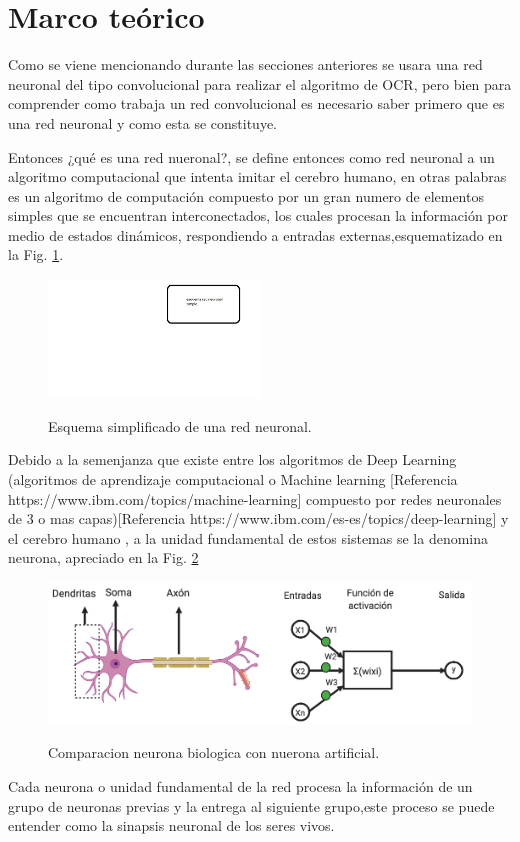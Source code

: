 \section{Marco teórico}
Como se viene mencionando durante las secciones anteriores se usara una red neuronal del tipo convolucional para realizar el algoritmo de OCR,
pero bien para comprender como trabaja un red convolucional es necesario saber primero que es una red neuronal y como esta se constituye.

Entonces ¿qué es una red nueronal?, se define entonces como red neuronal a un algoritmo computacional que intenta imitar el cerebro 
humano, en otras palabras es un algoritmo de computación compuesto por un gran numero de elementos simples que se 
encuentran interconectados, los cuales procesan la información por medio de estados dinámicos, respondiendo a entradas externas,esquematizado en 
 la Fig. \ref*{fig:esquema-redes}.
\begin{figure}[h]
    \centering
    \includegraphics[width=0.5\textwidth]{imgs/Redes-esquema.jpg}
    \label{fig:esquema-redes}
    \caption{Esquema simplificado de una red neuronal.}
\end{figure}
Debido a la semenjanza que existe entre los algoritmos de Deep Learning (algoritmos de aprendizaje computacional o 
Machine learning [Referencia https://www.ibm.com/topics/machine-learning] compuesto por redes neuronales 
de 3 o mas capas)[Referencia https://www.ibm.com/es-es/topics/deep-learning] y el cerebro humano , a la 
unidad fundamental de estos sistemas se la denomina neurona, apreciado en la Fig. \ref*{fig:comparativa-neuronas}
\begin{figure}[h]
    \centering
    \includegraphics[width=1\textwidth]{imgs/comparacion-neurona-red.png}
    \label{fig:comparativa-neuronas}
    \caption{Comparacion neurona biologica con nuerona artificial.}
\end{figure}
Cada neurona o unidad fundamental de la red procesa la información de un grupo de neuronas previas y la entrega al siguiente grupo,este proceso 
se puede entender como la sinapsis neuronal de los seres vivos.

